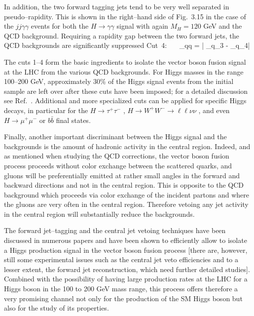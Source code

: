 In addition, the two forward tagging jets tend to be very well separated 
in pseudo--rapidity. This is shown in the right--hand side of Fig.~3.15
in the case of the $jj \gamma \gamma$ events for both the $H \to \gamma
\gamma$ signal with again $M_H=120$ GeV  and the QCD background. Requiring a 
rapidity gap between the two forward jets, the QCD backgrounds  are 
significantly suppressed  
\beq
{\rm Cut~4}: \ \  \  \Delta \eta_{qq} = | \eta_{q_3} - \eta_{q_4}| 
\eeq

The cuts 1--4 form the basic ingredients to isolate the vector boson fusion
signal at the LHC from the various QCD backgrounds. For Higgs masses in the 
range 100--200 GeV, approximately 30\% of the Higgs signal events from 
the initial sample are left over after these cuts have been imposed; for 
a detailed discussion see Ref.~\cite{Rainwater-thesis}.  Additional and more 
specialized cuts can be applied for specific Higgs decays, in particular 
for the $H \to \tau^+ \tau^-$ \cite{Zepp-tau}, $H \to W^+ W^- \to \ell 
\ell \nu \nu$ \cite{Zepp-WW,Zepp-WW-old}, and even $H \to \mu^+ \mu^-$
\cite{VVH-mu} or $b \bar b$ \cite{VVH-bb} final states.\s

Finally, another important discriminant between the Higgs signal and the
backgrounds is the amount of hadronic activity in the central region. 
Indeed, and as mentioned when studying the QCD corrections, the vector boson
fusion process proceeds without color exchange between the scattered quarks, 
and gluons will be preferentially emitted at rather small angles in the 
forward and backward directions and not in the central region. This is opposite
to the QCD background which proceeds via color exchange of the 
incident partons and where the gluons are very often in the central region. 
Therefore vetoing any jet activity in the central region will substantially 
reduce the backgrounds. \s

The forward jet--tagging and the central jet vetoing techniques have been
discussed in numerous papers and have been shown to
efficiently allow to isolate a Higgs production signal in the vector
boson fusion process [there are, however, still some experimental issues
such as the central jet veto efficiencies and to a lesser extent, the forward 
jet reconstruction, which need further detailed studies]. Combined with the 
possibility of having large production rates at the LHC for a Higgs boson in 
the 100 to 200 GeV mass range, this process offers therefore a very promising 
channel not only for the production of the SM Higgs boson but also 
for the study of its properties. 

